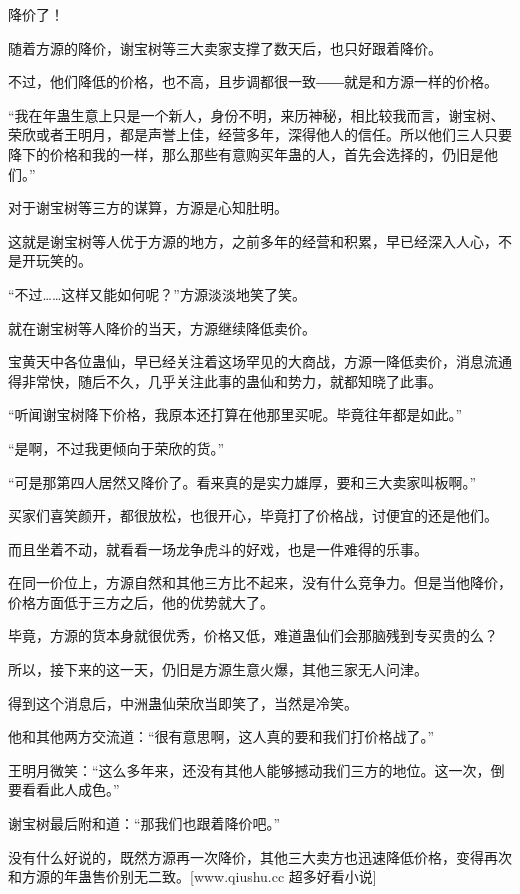 
\begin{this_body}

降价了！

随着方源的降价，谢宝树等三大卖家支撑了数天后，也只好跟着降价。

不过，他们降低的价格，也不高，且步调都很一致――就是和方源一样的价格。

“我在年蛊生意上只是一个新人，身份不明，来历神秘，相比较我而言，谢宝树、荣欣或者王明月，都是声誉上佳，经营多年，深得他人的信任。所以他们三人只要降下的价格和我的一样，那么那些有意购买年蛊的人，首先会选择的，仍旧是他们。”

对于谢宝树等三方的谋算，方源是心知肚明。

这就是谢宝树等人优于方源的地方，之前多年的经营和积累，早已经深入人心，不是开玩笑的。

“不过……这样又能如何呢？”方源淡淡地笑了笑。

就在谢宝树等人降价的当天，方源继续降低卖价。

宝黄天中各位蛊仙，早已经关注着这场罕见的大商战，方源一降低卖价，消息流通得非常快，随后不久，几乎关注此事的蛊仙和势力，就都知晓了此事。

“听闻谢宝树降下价格，我原本还打算在他那里买呢。毕竟往年都是如此。”

“是啊，不过我更倾向于荣欣的货。”

“可是那第四人居然又降价了。看来真的是实力雄厚，要和三大卖家叫板啊。”

买家们喜笑颜开，都很放松，也很开心，毕竟打了价格战，讨便宜的还是他们。

而且坐着不动，就看看一场龙争虎斗的好戏，也是一件难得的乐事。

在同一价位上，方源自然和其他三方比不起来，没有什么竞争力。但是当他降价，价格方面低于三方之后，他的优势就大了。

毕竟，方源的货本身就很优秀，价格又低，难道蛊仙们会那脑残到专买贵的么？

所以，接下来的这一天，仍旧是方源生意火爆，其他三家无人问津。

得到这个消息后，中洲蛊仙荣欣当即笑了，当然是冷笑。

他和其他两方交流道：“很有意思啊，这人真的要和我们打价格战了。”

王明月微笑：“这么多年来，还没有其他人能够撼动我们三方的地位。这一次，倒要看看此人成色。”

谢宝树最后附和道：“那我们也跟着降价吧。”

没有什么好说的，既然方源再一次降价，其他三大卖方也迅速降低价格，变得再次和方源的年蛊售价别无二致。[www.qiushu.cc 超多好看小说]


\end{this_body}
